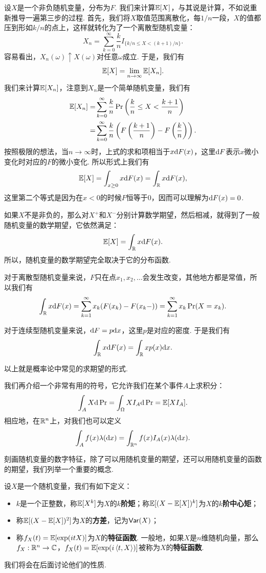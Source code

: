 设$X$是一个非负随机变量，分布为$F$. 我们来计算$\mathbb{E}[X]$，与其说是计算，不如说重新推导一遍第三步的过程. 首先，我们将$X$取值范围离散化，每$1/n$一段，$X$的值都压到形如$k/n$的点上，这样就转化为了一个离散型随机变量：
\[X_n=\sum_{k=0}^\infty\frac{k}{n}I_{\{k/n\leq X<(k+1)/n\}}.\]
容易看出，$X_n(\omega)\uparrow X(\omega)$对任意$\omega$成立. 于是，我们有
\[\mathbb{E}[X]=\lim_{n\to\infty}\mathbb{E}[X_n].\]
我们来计算$\mathbb{E}[X_n]$，注意到$X_n$是一个简单随机变量，我们有
\begin{align*}
    \mathbb{E}[X_n]=&\sum_{k=0}^\infty\frac{k}{n}\Pr\left(\frac{k}{n}\leq X<\frac{k+1}{n}\right)\\
    =&\sum_{k=0}^\infty\frac{k}{n}\left(F\left(\frac{k+1}{n}\right)-F\left(\frac{k}{n}\right)\right).
\end{align*}
按照极限的想法，当$n\to\infty$时，上式的求和项相当于$x\mathrm{d} F(x)$，这里$\mathrm{d} F$表示$x$微小变化时对应的$F$的微小变化. 所以形式上我们有
\[\mathbb{E}[X]=\int_{x\geq 0} x\mathrm{d} F(x)=\int_{\mathbb{R}} x\mathrm{d} F(x),\]
这里第二个等式是因为在$x<0$的时候$F$恒等于$0$，因而可以理解为$\mathrm{d} F(x)=0$.

如果$X$不是非负的，那么对$X^+$和$X^-$分别计算数学期望，然后相减，就得到了一般随机变量的数学期望，它依然满足：
\[\mathbb{E}[X]=\int_{\mathbb{R}} x\mathrm{d} F(x).\]
所以，随机变量的数学期望完全取决于它的分布函数. 

对于离散型随机变量来说，$F$只在点$x_1,x_2,\dots$会发生改变，其他地方都是常值，所以我们有
\[\int_{\mathbb{R}} x\mathrm{d} F(x)=\sum_{k=1}^\infty x_k(F(x_k)-F(x_k-))=\sum_{k=1}^\infty x_k\Pr(X=x_k).\]

对于连续型随机变量来说，$\mathrm{d} F=p\mathrm{d} x$，这里$p$是对应的密度. 于是我们有
\[\int_{\mathbb{R}} x\mathrm{d} F(x)=\int_{\mathbb{R}} x p(x)\mathrm{d} x.\]

以上就是概率论中常见的求期望的形式. 

我们再介绍一个非常有用的符号，它允许我们在某个事件$A$上求积分：
\[\int_A X\mathrm{d}\Pr=\int_{\Omega} XI_A\mathrm{d}\Pr=\mathbb{E}[XI_A].\]
相应地，在$\mathbb{R}^n$上，对我们也可以定义
\[\int_A f(x)\lambda(\mathrm{d} x)=\int_{\mathbb{R}^n} f(x)I_A(x)\lambda(\mathrm{d} x).\]


刻画随机变量的数字特征，除了可以用随机变量的期望，还可以用随机变量的函数的期望，我们列举一个重要的概念. 

\begin{definition}[矩，方差，特征函数]
设$X$是一个随机变量，我们有如下定义：
\begin{itemize}
    \item $k$是一个正整数，称$\mathbb{E}[X^k]$为$X$的\textbf{$k$阶矩}；称$\mathbb{E}[(X-\mathbb{E}[X])^k]$为$X$的\textbf{$k$阶中心矩}；
    \item 称$\mathbb{E}[(X-\mathbb{E}[X])^2]$为$X$的\textbf{方差}，记为$\mathsf{Var}(X)$；
    \item 称$f_X(t)=\mathbb{E}[\exp(i tX)]$为$X$的\textbf{特征函数}. 一般地，如果$X$是$n$维随机向量，那么$f_X:\mathbb{R}^n\to\mathbb{C}$，$f_X(t)=\mathbb{E}[\exp(i\left\langle{t},{X}\right\rangle)]$被称为$X$的\textbf{特征函数}. 
\end{itemize}
\end{definition}
我们将会在后面讨论他们的性质. 

